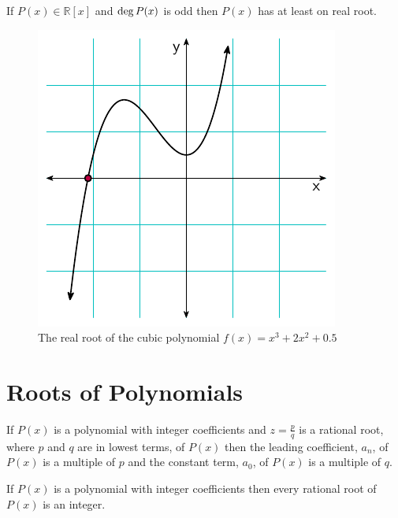 \begin{corollary}
    If $P(x) \in \mathbb{R}[x]$ and $\operatorname{deg} P(x)$ is odd then $P(x)$ has at least on real root.
\end{corollary}

\begin{figure}[!htpb]
\centering
\includegraphics[scale=1]{polynomials/figures/cubic_with_one_real_root}
\caption{The real root of the cubic polynomial $f(x)=x^3+2x^2+0.5$}
\end{figure}

\section{Roots of Polynomials}
\begin{theorem}
    If $P(x)$ is a polynomial with integer coefficients and $z=\frac{p}{q}$ is a 
    rational root, where $p$ and $q$ are in lowest terms, of $P(x)$ then 
    the leading coefficient, $a_{n}$, of $P(x)$ is a multiple of $p$ and the 
    constant term, $a_{0}$, of $P(x)$ is a multiple of $q$. 
\end{theorem}
\begin{corollary}
    If $P(x)$ is a polynomial with integer coefficients then every rational 
    root of $P(x)$ is an integer.
\end{corollary}

